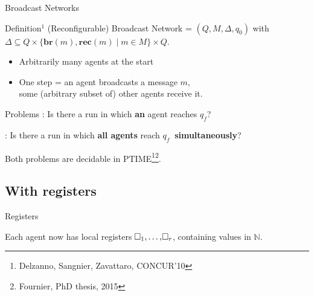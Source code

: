 \documentclass{beamer}
\newcommand{\reg}{\hspace{-0.5mm}\square}
\begin{document}
\begin{frame}{Broadcast Networks}
	\begin{block}{Definition$^1$}
		(Reconfigurable) Broadcast Network = $(Q, M, \Delta, q_0)$ with $\Delta \subseteq Q\times \{\mathbf{br}(m), \mathbf{rec}(m) \mid m \in M\} \times Q$.
	\end{block}
	
	\pause
	
	\begin{itemize}
		\item Arbitrarily many agents at the start
		
		\item One step = an agent broadcasts a message $m$,\\ some (arbitrary subset of) other agents receive it.
	\end{itemize}
	
	\pause 
	
	\begin{block}{Problems}
		{}: Is there a run in which \textbf{an} agent reaches \color{blue!60}$q_f$\color{black}?
		
		{}: Is there a run in which \textbf{all agents} reach \color{blue!60}$q_f~$\color{black} \textbf{simultaneously}?
	\end{block}
	
	Both problems are decidable in PTIME\footnote<3>{Delzanno, Sangnier, Zavattaro, CONCUR'10}\footnote<3>{Fournier, PhD thesis, 2015}.
\end{frame}

\subsection{With registers}

\begin{frame}
	\tableofcontents[currentsubsection]
\end{frame}

\begin{frame}{Registers}
	
	Each agent now has local registers $\reg_1, \ldots, \reg_r$, containing values in $\mathbb{N}$.\vspace{0.3cm}\pause
	
	
\end{frame}
\end{document}

